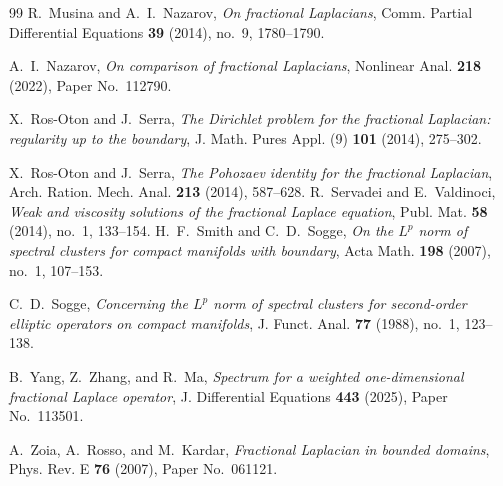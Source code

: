 \documentclass[11pt]{amsart}
\numberwithin{equation}{section}
\theoremstyle{remark}
\begin{document}
\begin{thebibliography}{99}
R.~Musina and A.~I.~Nazarov,
\emph{On fractional Laplacians},
Comm. Partial Differential Equations \textbf{39} (2014), no.~9, 1780--1790.

A.~I.~Nazarov,
\emph{On comparison of fractional Laplacians},
Nonlinear Anal. \textbf{218} (2022), Paper No.~112790.

X.~Ros-Oton and J.~Serra,
\emph{The Dirichlet problem for the fractional Laplacian:
regularity up to the boundary},
J. Math. Pures Appl. (9) \textbf{101} (2014), 275--302.

X.~Ros-Oton and J.~Serra,
\emph{The Pohozaev identity for the fractional Laplacian},
Arch. Ration. Mech. Anal. \textbf{213} (2014), 587--628.
R.~Servadei and E.~Valdinoci,
\emph{Weak and viscosity solutions of the fractional Laplace equation},
Publ. Mat. \textbf{58} (2014), no.~1, 133--154.
H.~F.~Smith and C.~D.~Sogge,
\emph{On the $L^p$ norm of spectral clusters for compact manifolds with boundary},
Acta Math. \textbf{198} (2007), no.~1, 107--153.

C.~D.~Sogge,
\emph{Concerning the $L^p$ norm of spectral clusters for second-order elliptic
operators on compact manifolds},
J. Funct. Anal. \textbf{77} (1988), no.~1, 123--138.

B.~Yang, Z.~Zhang, and R.~Ma,
\emph{Spectrum for a weighted one-dimensional fractional Laplace operator},
J. Differential Equations \textbf{443} (2025), Paper No.~113501.

A.~Zoia, A.~Rosso, and M.~Kardar,
\emph{Fractional Laplacian in bounded domains},
Phys. Rev. E \textbf{76} (2007), Paper No.~061121.

\end{thebibliography}
\end{document}
